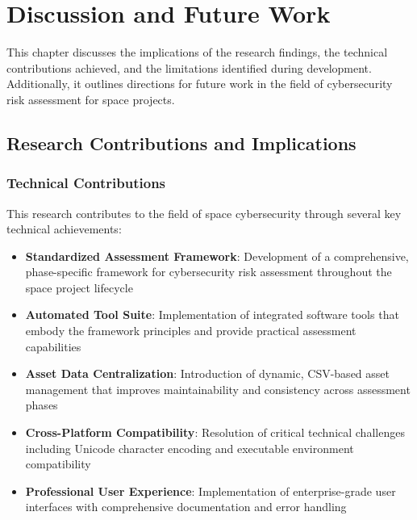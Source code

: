 \documentclass[binding=0.6cm]{sapthesis}
\begin{document}
\chapter{Discussion and Future Work}
\label{ch:discussion}

This chapter discusses the implications of the research findings, the technical contributions achieved, and the limitations identified during development. Additionally, it outlines directions for future work in the field of cybersecurity risk assessment for space projects.

\section{Research Contributions and Implications}

\subsection{Technical Contributions}

This research contributes to the field of space cybersecurity through several key technical achievements:

\begin{itemize}
    \item \textbf{Standardized Assessment Framework}: Development of a comprehensive, phase-specific framework for cybersecurity risk assessment throughout the space project lifecycle
    \item \textbf{Automated Tool Suite}: Implementation of integrated software tools that embody the framework principles and provide practical assessment capabilities
    \item \textbf{Asset Data Centralization}: Introduction of dynamic, CSV-based asset management that improves maintainability and consistency across assessment phases
    \item \textbf{Cross-Platform Compatibility}: Resolution of critical technical challenges including Unicode character encoding and executable environment compatibility
    \item \textbf{Professional User Experience}: Implementation of enterprise-grade user interfaces with comprehensive documentation and error handling
\end{itemize}
\end{document}
